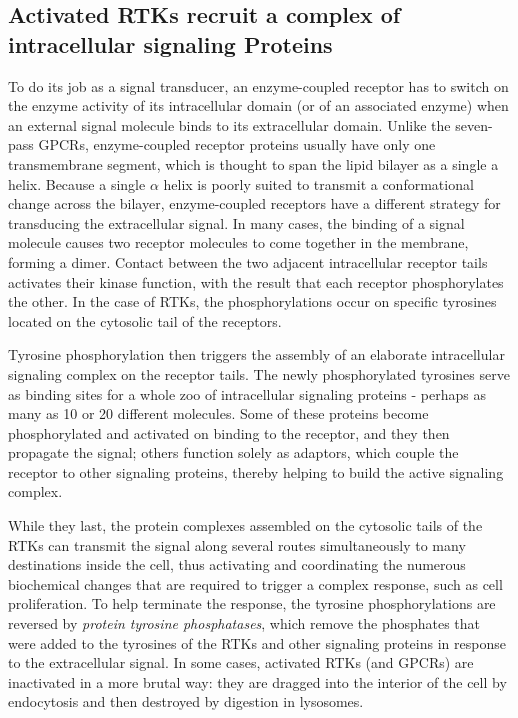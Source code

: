 \subsection{Activated RTKs recruit a complex of intracellular signaling Proteins}

To do its job as a signal transducer, an enzyme-coupled receptor has to
switch on the enzyme activity of its intracellular domain (or of an associated
enzyme) when an external signal molecule binds to its extracellular
domain. Unlike the seven-pass GPCRs, enzyme-coupled receptor proteins
usually have only one transmembrane segment, which is thought
to span the lipid bilayer as a single a helix. Because a single $\alpha$ helix is
poorly suited to transmit a conformational change across the bilayer,
enzyme-coupled receptors have a different strategy for transducing the
extracellular signal. In many cases, the binding of a signal molecule
causes two receptor molecules to come together in the membrane, forming
a dimer. Contact between the two adjacent intracellular receptor tails
activates their kinase function, with the result that each receptor phosphorylates
the other. In the case of RTKs, the phosphorylations occur on
specific tyrosines located on the cytosolic tail of the receptors.

Tyrosine phosphorylation then triggers the assembly of an elaborate
intracellular signaling complex on the receptor tails. The newly phosphorylated
tyrosines serve as binding sites for a whole zoo of intracellular
signaling proteins - perhaps as many as 10 or 20 different molecules.
Some of these proteins become phosphorylated and activated
on binding to the receptor, and they then propagate the signal;
others function solely as adaptors, which couple the receptor to other signaling
proteins, thereby helping to build the active signaling complex.

While they last, the protein complexes assembled on the cytosolic tails
of the RTKs can transmit the signal along several routes simultaneously
to many destinations inside the cell, thus activating and coordinating the
numerous biochemical changes that are required to trigger a complex
response, such as cell proliferation. To help terminate the response, the
tyrosine phosphorylations are reversed by \textit{protein tyrosine phosphatases},
which remove the phosphates that were added to the tyrosines of the
RTKs and other signaling proteins in response to the extracellular signal.
In some cases, activated RTKs (and GPCRs) are inactivated in a more brutal
way: they are dragged into the interior of the cell by endocytosis and
then destroyed by digestion in lysosomes.

